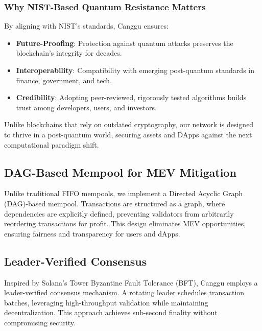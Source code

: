 \documentclass[12pt]{article}
\begin{document}
\subsubsection{Why NIST-Based Quantum Resistance Matters}
\begin{justify}
    By aligning with NIST’s standards, Canggu ensures:
    \begin{itemize}
        \item \textbf{Future-Proofing}: Protection against quantum attacks preserves the blockchain’s integrity for decades.
        \item \textbf{Interoperability}: Compatibility with emerging post-quantum standards in finance, government, and tech.
        \item \textbf{Credibility}: Adopting peer-reviewed, rigorously tested algorithms builds trust among developers, users, and investors.
    \end{itemize}

Unlike blockchains that rely on outdated cryptography, our network is designed to thrive in a post-quantum world, securing assets and DApps against the next computational paradigm shift.

\end{justify}


\subsection{DAG-Based Mempool for MEV Mitigation}
\begin{justify}
    Unlike traditional FIFO mempools, we implement a Directed Acyclic Graph (DAG)-based mempool. Transactions are structured as a graph, where dependencies are explicitly defined, preventing validators from arbitrarily reordering transactions for profit. This design eliminates MEV opportunities, ensuring fairness and transparency for users and dApps.
\end{justify}



\subsection{Leader-Verified Consensus}
\begin{justify}
Inspired by Solana’s Tower Byzantine Fault Tolerance (BFT), Canggu employs a leader-verified consensus mechanism. A rotating leader schedules transaction batches, leveraging high-throughput validation while maintaining decentralization. This approach achieves sub-second finality without compromising security.

\end{justify}
\end{document}
